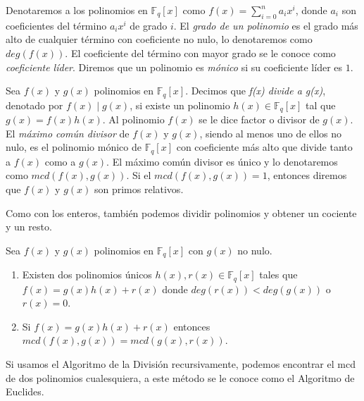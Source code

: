 Denotaremos a los polinomios en $\mathbb{F}_q[x]$ como $f(x) = \sum_{i=0}^n a_ix^i$, donde $a_i$ son coeficientes del término $a_ix^i$ de grado $i$. El \textit{grado de un polinomio} es el grado más alto de cualquier término con coeficiente no nulo, lo denotaremos como $deg(f(x))$. El coeficiente del término con mayor grado se le conoce como \textit{coeficiente líder}. Diremos que un polinomio es \textit{mónico} si su coeficiente líder es $1$.


Sea $f(x)$ y $g(x)$ polinomios en $\mathbb{F}_q[x]$. Decimos que \textit{f(x) divide a g(x)}, denotado por $f(x) \mid g(x)$, si existe un polinomio $h(x) \in \mathbb{F}_q[x]$ tal que $g(x) = f(x)h(x)$. Al polinomio $f(x)$ se le dice factor o divisor de $g(x)$. El \textit{máximo común divisor} de $f(x)$ y $g(x)$, siendo al menos uno de ellos no nulo, es el polinomio mónico de $\mathbb{F}_q[x]$ con coeficiente más alto que divide tanto a $f(x)$ como a $g(x)$. El máximo común divisor es único y lo denotaremos como $mcd(f(x),g(x))$. Si el $mcd(f(x),g(x)) = 1$, entonces diremos que $f(x)$ y $g(x)$ son primos relativos.

Como con los enteros, también podemos dividir polinomios y obtener un cociente y un resto.

\begin{theorem}
Sea $f(x)$ y $g(x)$ polinomios en $\mathbb{F}_q[x]$ con $g(x)$ no nulo.
\begin{enumerate}
	\item Existen dos polinomios únicos $h(x),r(x) \in \mathbb{F}_q[x]$ tales que $f(x) = g(x)h(x) + r(x)$ donde $deg(r(x)) < deg(g(x))$ o $r(x) = 0$.
	\item Si $f(x) = g(x)h(x) + r(x)$ entonces $mcd(f(x),g(x)) = mcd(g(x),r(x))$.
\end{enumerate}
\end{theorem}

Si usamos el Algoritmo de la División recursivamente, podemos encontrar el mcd de dos polinomios cualesquiera, a este método se le conoce como el Algoritmo de Euclides.

